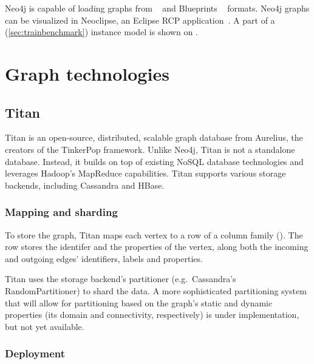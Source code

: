 Neo4j is capable of loading graphs from \graphml{}~\cite{GraphML} and Blueprints \graphson{}~\cite{BlueprintsGraphSON} formats. Neo4j graphs can be visualized in Neoclipse, an Eclipse RCP application~\cite{Neoclipse}. A part of a \tb{} (\autoref{sec:trainbenchmark}) instance model is shown on .

\section{Graph technologies}



\subsection{Titan}
\label{subsec:titan}

Titan %
is an open-source, distributed, scalable graph database from Aurelius, the creators of the TinkerPop framework. Unlike Neo4j, Titan is not a standalone database. Instead, it builds on top of existing NoSQL database technologies and leverages Hadoop's MapReduce capabilities. Titan supports various storage backends, including Cassandra and HBase.


\subsubsection{Mapping and sharding}

To store the graph, Titan maps each vertex to a row of a column family (). The row stores the identifer and the properties of the vertex, along both the incoming and outgoing edges' identifiers, labels and properties.

Titan uses the storage backend's partitioner (e.g.\ Cassandra's RandomPartitioner) to shard the data. A more sophisticated partitioning system that will allow for partitioning based on the graph's static and dynamic properties (its domain and connectivity, respectively) is under implementation, but not yet available.


\subsubsection{Deployment}

